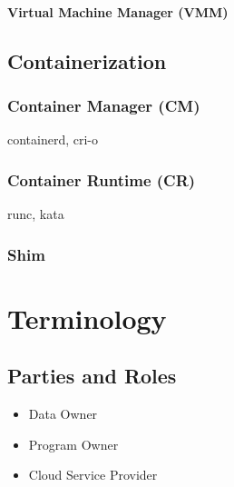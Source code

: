 \subsubsection{Virtual Machine Manager (VMM)}

\section{Containerization}

\subsection{Container Manager (CM)}

containerd, cri-o

\subsection{Container Runtime (CR)}

runc, kata

\subsection{Shim}


\chapter{Terminology}


\section{Parties and Roles}

\begin{itemize}
  \item Data Owner
  \item Program Owner
  \item Cloud Service Provider
\end{itemize}


